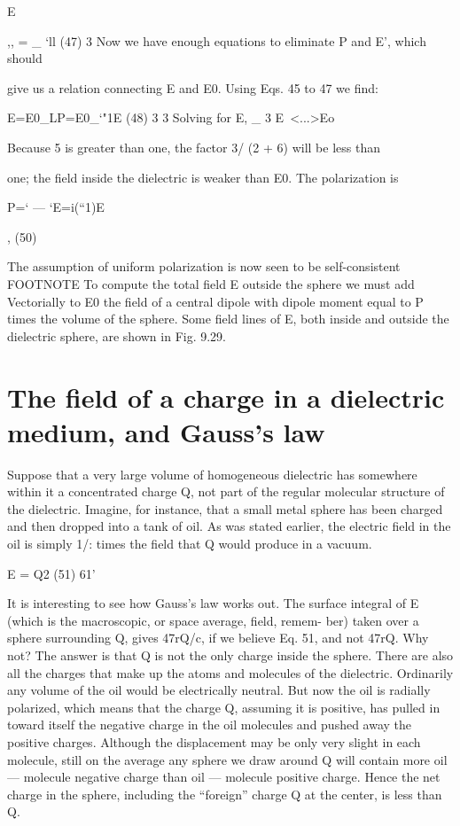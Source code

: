 \begin{equation}
\end{equation}
E{,, = _ ‘ll (47)
3
Now we have enough equations to eliminate P and E', which should

give us a relation connecting E and E0. Using Eqs. 45 to 47 we find:

\begin{equation}
\end{equation}
E=E0_LP=E0_‘"1E (48)
3 3
Solving for E,
_ 3
E~<...>Eo 

Because 5 is greater than one, the factor 3/ (2 + 6) will be less than

one; the field inside the dielectric is weaker than E0. The polarization
is

\begin{equation}
\end{equation}
P=‘ --- ‘E=i(``1)E{, (50)

The assumption of uniform polarization is now seen to be self-consistent
        FOOTNOTE
To compute the total field E outside the sphere we must
add Vectorially to E0 the field of a central dipole with dipole moment
equal to P times the volume of the sphere. Some field lines of E,
both inside and outside the dielectric sphere, are shown in Fig. 9.29.

\section{The field of a charge in a dielectric medium, and Gauss's law}

Suppose that a very large volume of homogeneous dielectric has
somewhere within it a concentrated charge Q, not part of the regular
molecular structure of the dielectric. Imagine, for instance, that a
small metal sphere has been charged and then dropped into a tank
of oil. As was stated earlier, the electric field in the oil is simply 1/:
times the field that Q would produce in a vacuum.

\begin{equation}
\end{equation}
E = Q2 (51)
61'

It is interesting to see how Gauss's law works out. The surface integral
of E (which is the macroscopic, or space average, field, remem-
ber) taken over a sphere surrounding Q, gives 47rQ/c, if we believe
Eq. 51, and not 47rQ. Why not? The answer is that Q is not the only
charge inside the sphere. There are also all the charges that make up
the atoms and molecules of the dielectric. Ordinarily any volume
of the oil would be electrically neutral. But now the oil is radially
polarized, which means that the charge Q, assuming it is positive, has
pulled in toward itself the negative charge in the oil molecules and
pushed away the positive charges. Although the displacement may
be only very slight in each molecule, still on the average any sphere
we draw around Q will contain more oil --- molecule negative charge
than oil --- molecule positive charge. Hence the net charge in the
sphere, including the ``foreign'' charge Q at the center, is less than Q.

}}

